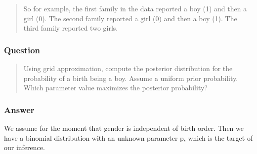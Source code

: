 \documentclass[
]{book}
\begin{document}
\begin{quote}
So for example, the first family in the data reported a boy (1) and then a girl (0). The second family reported a girl (0) and then a boy (1). The third family reported two girls.
\end{quote}

\hypertarget{question-28}{%
\subsubsection*{Question}\label{question-28}}

\begin{quote}
Using grid approximation, compute the posterior distribution for the probability of a birth being a boy. Assume a uniform prior probability. Which parameter value maximizes the posterior probability?
\end{quote}

\hypertarget{answer-28}{%
\subsubsection*{Answer}\label{answer-28}}

We assume for the moment that gender is independent of birth order. Then we have a binomial distribution with an unknown parameter p, which is the target of our inference.
\end{document}
